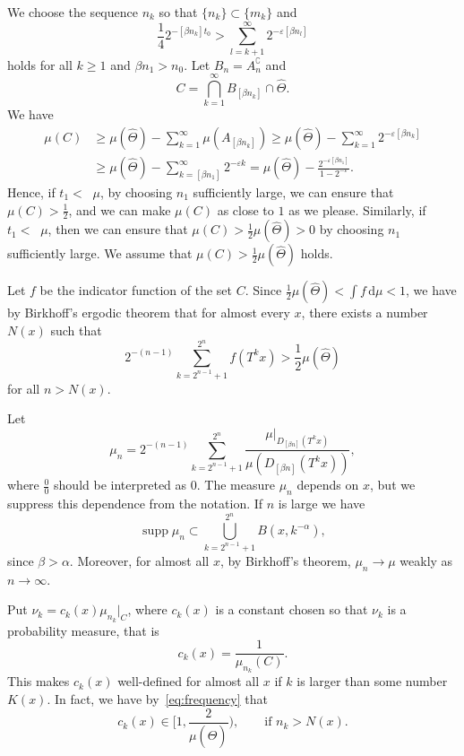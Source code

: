 \documentclass[AHL,Unicode,longabstracts]{cedram}
\DeclareMathOperator{\ldimh}{\underline{dim}_H}
\DeclareMathOperator{\udimh}{\overline{dim}_H}
\DeclareMathOperator{\supp}{supp}
\newcommand*{\dd}{\mathrm{d}}
\begin{document}
We choose the sequence $n_k$ so that $\{n_k\} \subset \{m_k\}$ and
\begin{equation}\label{eq:nk2}
\frac{1}{4} 2^{- [\beta n_k] t_0} > \sum_{l = k+1}^\infty 2^{-
\varepsilon [\beta n_l]}
\end{equation}
holds for all $k \geq 1$ and $\beta n_1 > n_0$. Let $B_n = A_n^\complement$ and
\[
C = \bigcap_{k=1}^\infty B_{[\beta n_k]} \cap \hat{\Theta}.
\]
We have
\begin{align*}
\mu (C) &\geq \mu (\hat{\Theta}) - \sum_{k=1}^\infty \mu (A_{[\beta n_k]}) \geq \mu (\hat{\Theta}) - \sum_{k=1}^\infty 2^{-
\varepsilon [\beta n_k]} \\ &\geq \mu (\hat{\Theta}) -
\sum_{k=[\beta n_1]}^\infty 2^{-\varepsilon k} = \mu (\hat{\Theta}) - \frac{2^{-\varepsilon [\beta n_1]}}{1 - 2^{-\varepsilon}}.
\end{align*}
Hence, if $t_1 < \ldimh \mu$, by choosing $n_1$ sufficiently large, we can ensure that $\mu (C) > \frac{1}{2}$, and we can make $\mu (C)$ as close to $1$ as we please. Similarly, if $t_1 < \udimh \mu$, then we can ensure that $\mu (C) > \frac{1}{2} \mu (\hat{\Theta}) > 0$ by choosing $n_1$ sufficiently large. We assume that $\mu (C) >
\frac{1}{2} \mu (\hat{\Theta})$ holds.

Let $f$ be the indicator function of the set $C$. Since $\frac{1}{2}
\mu (\hat{\Theta}) < \int f \, \dd \mu < 1$, we have by Birkhoff's ergodic theorem that for almost every $x$, there exists a number $N(x)$ such that
\begin{equation}\label{eq:frequency}
2^{-(n-1)} \sum_{k = 2^{n-1} + 1}^{2^n} f (T^k x) > \frac{1}{2} \mu (\hat{\Theta})
\end{equation}
for all $n > N (x)$.

Let
\[
\mu_n = 2^{-(n-1)} \sum_{k = 2^{n-1} + 1}^{2^n} \frac{\mu |_{D_{[\beta n]} (T^k x)}}{\mu (D_{[\beta n]} (T^k x))},
\]
where $\frac{0}{0}$ should be interpreted as $0$. The measure $\mu_n$ depends on $x$, but we suppress this dependence from the notation. If $n$ is large we have
\[
\supp \mu_n \subset \bigcup_{k = 2^{n-1}+1}^{2^n} B(x,k^{-\alpha}),
\]
since $\beta > \alpha$. Moreover, for almost all $x$, by Birkhoff's theorem, $\mu_n \to \mu$ weakly as $n \to \infty$.

Put $\nu_k = c_k(x) \mu_{n_k}|_C$, where $c_k (x)$ is a constant chosen so that $\nu_k$ is a probability measure, that is
\[
c_k (x) = \frac{1}{\mu_{n_k} (C)}.
\]
This makes $c_k (x)$ well-defined for almost all $x$ if $k$ is larger than some number $K(x)$. In fact, we have by~\eqref{eq:frequency} that
\[
c_k (x) \in \biggl[1,\frac{2}{\mu(\hat{\Theta})} \biggr), \qquad
\text{if } n_k > N(x).
\]
\end{document}
